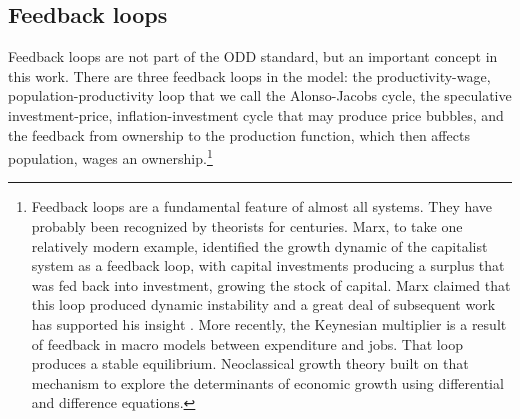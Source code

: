 
\subsection{Feedback loops}
Feedback loops are not part of the ODD standard, but an important concept in this work. 
There are three \glspl{feedback loop} in the model: the productivity-wage, population-productivity loop that we call the Alonso-Jacobs cycle,  the speculative investment-price, inflation-investment cycle that may produce price bubbles, and the feedback from ownership to the production function, which then affects population, wages an ownership.\footnote{Feedback loops are a fundamental feature of almost all systems. They have probably been recognized by theorists for centuries. Marx, to take one relatively modern example, identified the growth dynamic of the capitalist system  as a feedback loop, with capital investments producing a surplus that was fed back into investment, growing the stock of capital. Marx claimed that this loop produced dynamic instability and a great deal of subsequent work has supported his insight \cite{dumenilStabilityInstabilityDynamic1986} \cite{schumpeterInstabilityCapitalism1928}. More recently, the Keynesian multiplier is a result of feedback in macro models between expenditure and jobs. That loop produces a stable equilibrium. Neoclassical growth theory built on that mechanism to explore the determinants of economic growth using differential and difference equations. %
}
 
